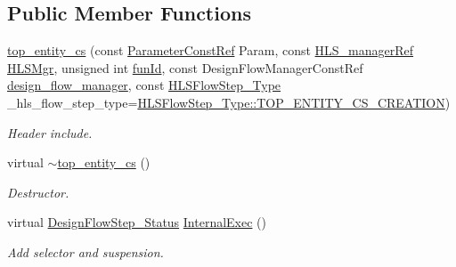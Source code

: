 \subsection*{Public Member Functions}
\begin{DoxyCompactItemize}
\item 
\hyperlink{classtop__entity__cs_a9df8ecca83132db26a9c1d297d07254b}{top\+\_\+entity\+\_\+cs} (const \hyperlink{Parameter_8hpp_a37841774a6fcb479b597fdf8955eb4ea}{Parameter\+Const\+Ref} Param, const \hyperlink{hls__manager_8hpp_acd3842b8589fe52c08fc0b2fcc813bfe}{H\+L\+S\+\_\+manager\+Ref} \hyperlink{classHLS__step_ade85003a99d34134418451ddc46a18e9}{H\+L\+S\+Mgr}, unsigned int \hyperlink{classHLSFunctionStep_a3e6434fd86c698b0c70520b859bff5b0}{fun\+Id}, const Design\+Flow\+Manager\+Const\+Ref \hyperlink{classDesignFlowStep_ab770677ddf087613add30024e16a5554}{design\+\_\+flow\+\_\+manager}, const \hyperlink{hls__step_8hpp_ada16bc22905016180e26fc7e39537f8d}{H\+L\+S\+Flow\+Step\+\_\+\+Type} \+\_\+hls\+\_\+flow\+\_\+step\+\_\+type=\hyperlink{hls__step_8hpp_ada16bc22905016180e26fc7e39537f8da243aeea128fd37ee739679d8c24dcfc3}{H\+L\+S\+Flow\+Step\+\_\+\+Type\+::\+T\+O\+P\+\_\+\+E\+N\+T\+I\+T\+Y\+\_\+\+C\+S\+\_\+\+C\+R\+E\+A\+T\+I\+ON})
\begin{DoxyCompactList}\small\item\em Header include. \end{DoxyCompactList}\item 
virtual \hyperlink{classtop__entity__cs_ae132a928c3a5cf4cc1874bf410560d75}{$\sim$top\+\_\+entity\+\_\+cs} ()
\begin{DoxyCompactList}\small\item\em Destructor. \end{DoxyCompactList}\item 
virtual \hyperlink{design__flow__step_8hpp_afb1f0d73069c26076b8d31dbc8ebecdf}{Design\+Flow\+Step\+\_\+\+Status} \hyperlink{classtop__entity__cs_a5d81c98939f48e4bdd7fe81f651000a2}{Internal\+Exec} ()
\begin{DoxyCompactList}\small\item\em Add selector and suspension. \end{DoxyCompactList}\end{DoxyCompactItemize}
